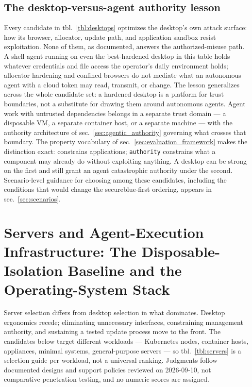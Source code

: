 \documentclass[
  english,
  9pt,
]{extarticle}
\begin{document}
\subsection{The desktop-versus-agent authority
lesson}\label{the-desktop-versus-agent-authority-lesson}

Every candidate in tbl.~\ref{tbl:desktops} optimizes the desktop's own
attack surface: how its browser, allocator, update path, and application
sandbox resist exploitation. None of them, as documented, answers the
authorized-misuse path. A shell agent running on even the best-hardened
desktop in this table holds whatever credentials and file access the
operator's daily environment holds; allocator hardening and confined
browsers do not mediate what an autonomous agent with a cloud token may
read, transmit, or change. The lesson generalizes across the whole
candidate set: a hardened desktop is a platform for trust boundaries,
not a substitute for drawing them around autonomous agents. Agent work
with untrusted dependencies belongs in a separate trust domain --- a
disposable VM, a separate container host, or a separate machine --- with
the authority architecture of sec.~\ref{sec:agentic_authority} governing
what crosses that boundary. The property vocabulary of
sec.~\ref{sec:evaluation_framework} makes the distinction exact:
 constrains applications;
\texttt{authority} constrains what a component may already do without
exploiting anything. A desktop can be strong on the first and still
grant an agent catastrophic authority under the second. Scenario-level
guidance for choosing among these candidates, including the conditions
that would change the secureblue-first ordering, appears in
sec.~\ref{sec:scenarios}.

\newpage

\section{Servers and Agent-Execution Infrastructure: The
Disposable-Isolation Baseline and the Operating-System
Stack}\label{sec:servers}

Server selection differs from desktop selection in what dominates.
Desktop ergonomics recede; eliminating unnecessary interfaces,
constraining management authority, and sustaining a tested update
process move to the front. The candidates below target different
workloads --- Kubernetes nodes, container hosts, appliances, minimal
systems, general-purpose servers --- so tbl.~\ref{tbl:servers} is a
selection guide per workload, not a universal ranking. Judgments follow
documented designs and support policies reviewed on 2026-09-10, not
comparative penetration testing, and no numeric scores are assigned.
\end{document}
